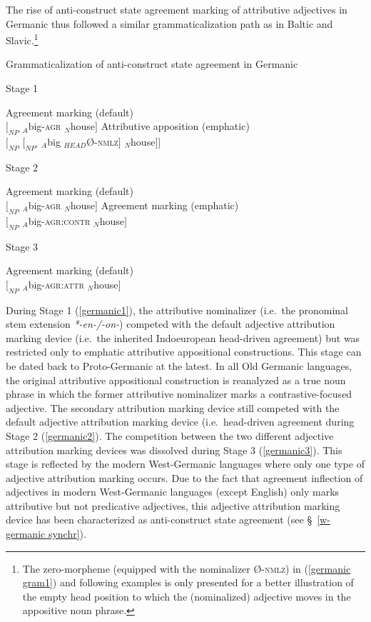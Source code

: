 {The rise of anti-construct state agreement marking of attributive adjectives in Germanic thus followed a similar grammaticalization path as in Baltic and Slavic.\footnote{The zero-morpheme (equipped with the nominalizer Ø-\textsc{nmlz}) in (\ref{germanic gram1}) and following examples is only presented for a better illustration of the empty head position to which the (nominalized) adjective moves in the appositive noun phrase.}
\begin{exe}
\ex \label{germanic gram1} Grammaticalization of anti-construct state agreement in Germanic
\begin{xlist}
\ex	Stage 1 \label{germanic1}
\begin{xlist}
\ex	Agreement marking (default)\\
$[_{NP}$ $_{A}$big-\textsc{agr} $_{N}$house$]$
\ex Attributive apposition (emphatic)\\
$[_{NP}$ $[_{NP'}$ $_{A}$big $_{HEAD}$Ø-\textsc{nmlz}$]$ $_{N}$house$] ]$\label{germanic art1}
\end{xlist}
\ex 	Stage 2 \label{germanic2}
\begin{xlist}
\ex	Agreement marking (default) \\
$[_{NP}$ $_{A}$big-\textsc{agr} $_{N}$house$]$
\ex	Agreement marking (emphatic) \\
$[_{NP}$ $_{A}$big-\textsc{agr:contr} $_{N}$house$]$\label{germanic ACAgr}
\end{xlist}
\ex 	Stage 3 \label{germanic3}
\begin{xlist}
\ex 	Agreement marking (default)\\
$[_{NP}$ $_{A}$big-\textsc{agr:attr} $_{N}$house$]$
\end{xlist}
\end{xlist}
\end{exe}
During Stage 1 (\ref{germanic1}), the attributive nominalizer (i.e.~the pronominal stem extension \textit{*-en-/-on-}) competed with the default adjective attribution marking device (i.e.~the inherited Indoeuropean head-driven agreement) but was restricted only to emphatic attributive appositional constructions. This stage can be dated back to Proto-Germanic at the latest. In all Old Germanic languages, the original attributive appositional construction is reanalyzed as a true noun phrase in which the former attributive nominalizer marks a contrastive-focused adjective. The secondary attribution marking device still competed with the default adjective attribution marking device (i.e.~head-driven agreement during Stage 2 (\ref{germanic2}). The competition between the two different adjective attribution marking devices was dissolved during Stage 3 (\ref{germanic3}). This stage is reflected by the modern West-Germanic languages where only one type of adjective attribution marking occurs. Due to the fact that agreement inflection of adjectives in modern West-Germanic languages (except English) only marks attributive but not predicative adjectives, this adjective attribution marking device has been characterized as anti-construct state agreement (see \S~\ref{w-germanic synchr}).

}
